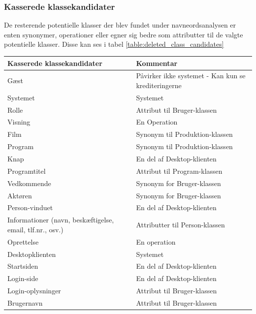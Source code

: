 \subsubsection{Kasserede klassekandidater}
De resterende potentielle klasser der blev fundet under navneordsanalysen er enten synonymer, operationer eller egner sig bedre som attributter til de valgte potentielle klasser. Disse kan ses i tabel \ref{table:deleted_class_candidates}

\begin{table}[H]
    \begin{tabularx}{\textwidth}{|>{\RaggedRight}X|>{\RaggedRight}X|}
        \hline
        \textbf{Kasserede klassekandidater} & \textbf{Kommentar} \\
        \hline
        Gæst & Påvirker ikke systemet - Kan kun se krediteringerne\\
        \hline
        Systemet & Systemet  \\
        \hline
        Rolle   & Attribut til Bruger-klassen\\
        \hline
        Visning  & En Operation\\
        \hline
        Film & Synonym til Produktion-klassen\\ 
        \hline
        Program & Synonym til Produktion-klassen\\ 
        \hline
        Knap & En del af Desktop-klienten\\
        \hline
        Programtitel & Attribut til Program-klassen\\
        \hline
        Vedkommende & Synonym for Bruger-klassen\\
        \hline
        Aktøren &  Synonym for Bruger-klassen\\
        \hline
        Person-vinduet & En del af Desktop-klienten\\
        \hline
        Informationer (navn, beskæftigelse, email, tlf.nr., osv.) &  Attributter til Person-klassen\\
        \hline
        Oprettelse & En operation \\
        \hline
        Desktopklienten &  Systemet\\
        \hline
        Startsiden &  En del af Desktop-klienten\\
        \hline
        Login-side & En del af Desktop-klienten\\
        \hline
        Login-oplysninger & Attribut til Bruger-klassen\\
        \hline
        Brugernavn & Attribut til Bruger-klassen\\

\end{tabularx}
\end{table}
